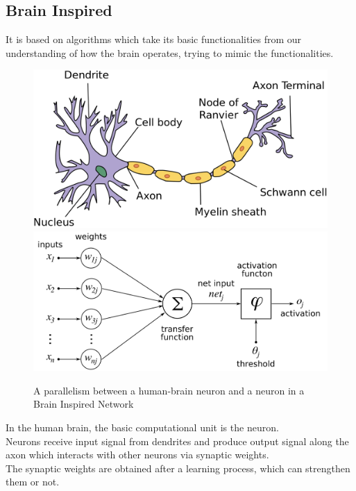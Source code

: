 \subsection{Brain Inspired}
It is based on algorithms which take its basic functionalities from our understanding of how the brain operates, trying to mimic the functionalities.

\begin{figure}[H]
\centering
\captionsetup{justification=centering}
\includegraphics[scale=0.15]{./figure/human_neuron.PNG}\\

\includegraphics[scale=0.15]{./figure/nn_neuron.PNG}

\caption{A parallelism between a human-brain neuron and a neuron in a Brain Inspired Network\cite{WEBSITE:11}\cite{WEBSITE:13}}
\label{fig:neuron}
\end{figure}
In the human brain, the basic computational unit is the neuron.\\ Neurons receive input signal from dendrites and produce output signal along the axon which interacts with other neurons via synaptic weights.\\ The synaptic weights are obtained after a learning process, which can strengthen them or not.

